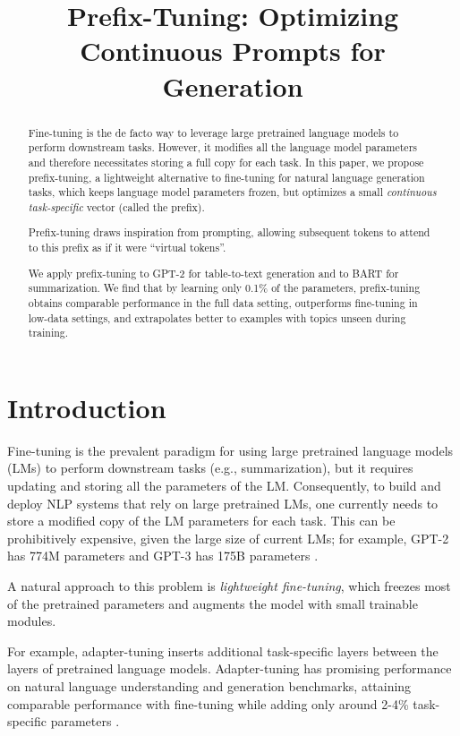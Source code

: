 \title{Prefix-Tuning: Optimizing Continuous Prompts for Generation}

\begin{abstract}
Fine-tuning is the de facto way to leverage large pretrained language models to perform downstream tasks. However, it modifies all the language model parameters and therefore necessitates storing a full copy for each task. In this paper, we propose prefix-tuning, a lightweight alternative to fine-tuning for natural language generation tasks, which keeps language model parameters frozen, but optimizes a small \emph{continuous task-specific} vector (called the prefix). 

Prefix-tuning draws inspiration from prompting, allowing subsequent tokens to attend to this prefix as if it were ``virtual tokens''. 

We apply prefix-tuning to GPT-2 for table-to-text generation and to BART for summarization. We find that by learning only 0.1\% of the parameters, prefix-tuning obtains comparable performance in the full data setting, outperforms fine-tuning in low-data settings, and extrapolates better to examples with topics unseen during training.
\end{abstract}

\section{Introduction}
\label{sec:intro}

Fine-tuning is the prevalent paradigm for using large pretrained language models (LMs) \cite{Radford2019gpt2,devlin-etal-2019-bert} to perform downstream tasks (e.g., summarization), but it requires updating and storing all the parameters of the LM. Consequently, to build and deploy NLP systems that rely on large pretrained LMs, one currently needs to store a modified copy of the LM parameters for each task.  This can be prohibitively expensive, given the large size of current LMs; for example, GPT-2 has 774M parameters \cite{Radford2019gpt2} and GPT-3 has 175B parameters \cite{brown2020language}. 

A natural approach to this problem is \emph{lightweight fine-tuning}, which freezes most of the pretrained parameters and augments the model with small trainable modules.

For example, adapter-tuning \cite{Rebuffi2017Adapter,pmlr-v97-houlsby19a} inserts additional task-specific layers between the layers of pretrained language models. Adapter-tuning has promising performance on natural language understanding and generation benchmarks, attaining comparable performance with fine-tuning while adding only around 2-4\% task-specific parameters \cite{pmlr-v97-houlsby19a,lin-etal-2020-exploring}. 

